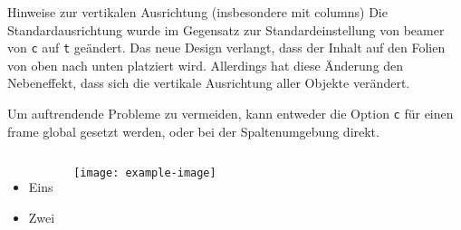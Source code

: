 \documentclass[
	german,%
	accentcolor=9c,%
]{tudabeamer}
\newcommand*{\code}[1]{\texttt{#1}}
\begin{document}
\begin{frame}{Hinweise zur vertikalen Ausrichtung (insbesondere mit columns)}
Die Standardausrichtung wurde im Gegensatz zur Standardeinstellung von beamer von \code{c} auf \code{t} geändert.
Das neue Design verlangt, dass der Inhalt auf den Folien von oben nach unten platziert wird.
Allerdings hat diese Änderung den Nebeneffekt, dass sich die vertikale Ausrichtung aller Objekte verändert.

Um auftrendende Probleme zu vermeiden, kann entweder die Option \code{c} für einen frame global gesetzt werden, oder bei der Spaltenumgebung direkt.

\begin{columns}[onlytextwidth,c]
	\begin{itemize}
		\item Eins
		\item Zwei
	\end{itemize}
	\texttt{[image: example-image]}
\end{columns}
\end{frame}
\end{document}
